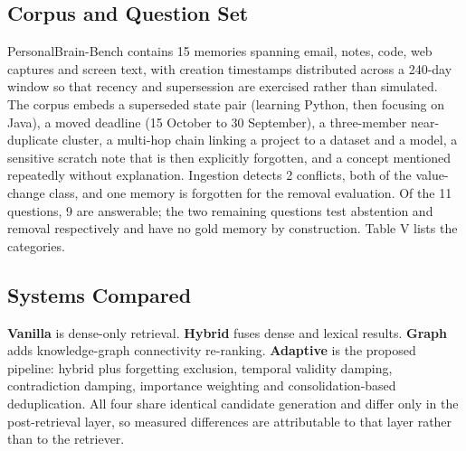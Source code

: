 \documentclass[conference]{IEEEtran}
\begin{document}
\subsection{Corpus and Question Set}
PersonalBrain-Bench contains 15 memories spanning email, notes, code, web captures and screen text, with creation timestamps distributed across a 240-day window so that recency and supersession are exercised rather than simulated. The corpus embeds a superseded state pair (learning Python, then focusing on Java), a moved deadline (15 October to 30 September), a three-member near-duplicate cluster, a multi-hop chain linking a project to a dataset and a model, a sensitive scratch note that is then explicitly forgotten, and a concept mentioned repeatedly without explanation. Ingestion detects 2 conflicts, both of the value-change class, and one memory is forgotten for the removal evaluation. Of the 11 questions, 9 are answerable; the two remaining questions test abstention and removal respectively and have no gold memory by construction. Table V lists the categories.
\begin{table}[!t]
\caption{Question Categories in PersonalBrain-Bench}
\label{tab:v}
\centering
{}
\end{table}

\subsection{Systems Compared}
\textbf{Vanilla} is dense-only retrieval. \textbf{Hybrid} fuses dense and lexical results. \textbf{Graph} adds knowledge-graph connectivity re-ranking. \textbf{Adaptive} is the proposed pipeline: hybrid plus forgetting exclusion, temporal validity damping, contradiction damping, importance weighting and consolidation-based deduplication. All four share identical candidate generation and differ only in the post-retrieval layer, so measured differences are attributable to that layer rather than to the retriever.
\end{document}

